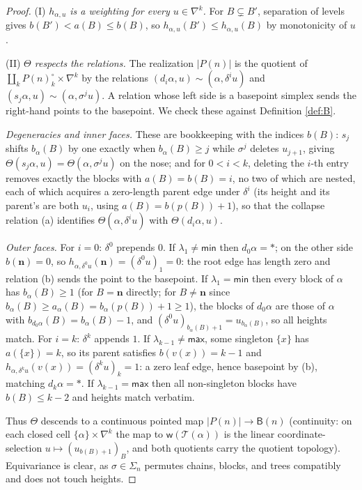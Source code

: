 \documentclass[12pt]{amsart}
\theoremstyle{definition}
\theoremstyle{remark}
\newcommand{\BC}{\mathsf{B}}                     %
\newcommand{\TreeF}{\mathcal{T}}                 %
\newcommand{\wt}{\mathsf{w}}                     %
\newcommand{\Thet}{\Theta}                       %
\newcommand{\basept}{\ast}
\begin{document}
\begin{proof}
(I) \emph{$h_{\alpha,u}$ is a weighting for every $u\in\nabla^k$.} For $B\subsetneq B'$, separation of levels gives $b(B')<a(B)\leq b(B)$, so $h_{\alpha,u}(B')\leq h_{\alpha,u}(B)$ by monotonicity of $u$.

(II) \emph{$\Thet$ respects the relations.} The realization $|P(n)|$ is the quotient of $\coprod_k P(n)^{\circ}_k\times \nabla^k$ by the relations $(d_i\alpha, u)\sim (\alpha, \delta^i u)$ and $(s_j \alpha, u)\sim (\alpha, \sigma^j u)$. A relation whose left side is a basepoint simplex sends the right-hand points to the basepoint. We check these against Definition \ref{def:B}.

\emph{Degeneracies and inner faces.} These are bookkeeping with the indices $b(B)$: $s_j$ shifts $b_\alpha(B)$ by one exactly when $b_\alpha(B)\geq j$ while $\sigma^j$ deletes $u_{j+1}$, giving $\Thet(s_j\alpha,u)=\Thet(\alpha,\sigma^ju)$ on the nose; and for $0<i<k$, deleting the $i$-th entry removes exactly the blocks with $a(B)=b(B)=i$, no two of which are nested, each of which acquires a zero-length parent edge under $\delta^i$ (its height and its parent's are both $u_i$, using $a(B)=b(p(B))+1$), so that the collapse relation (a) identifies $\Thet(\alpha,\delta^iu)$ with $\Thet(d_i\alpha,u)$.

\emph{Outer faces.} For $i=0$: $\delta^0$ prepends $0$. If $\lambda_1 \neq \mathsf{min}$ then $d_0\alpha=\basept$; on the other side $b(\mathbf{n}) = 0$, so $h_{\alpha, \delta^0 u}(\mathbf{n}) = (\delta^0 u)_1 = 0$: the root edge has length zero and relation (b) sends the point to the basepoint. If $\lambda_1 = \mathsf{min}$ then every block of $\alpha$ has $b_\alpha(B)\geq 1$ (for $B = \mathbf{n}$ directly; for $B\neq \mathbf{n}$ since $b_\alpha(B)\geq a_\alpha(B) = b_\alpha(p(B))+1\geq 1$), the blocks of $d_0\alpha$ are those of $\alpha$ with $b_{d_0\alpha}(B) = b_\alpha(B)-1$, and $(\delta^0u)_{b_\alpha(B)+1} = u_{b_\alpha(B)}$, so all heights match. For $i=k$: $\delta^k$ appends $1$. If $\lambda_{k-1}\neq \mathsf{max}$, some singleton $\{x\}$ has $a(\{x\}) = k$, so its parent satisfies $b(v(x)) = k-1$ and $h_{\alpha,\delta^ku}(v(x)) = (\delta^ku)_k = 1$: a zero leaf edge, hence basepoint by (b), matching $d_k\alpha = \basept$. If $\lambda_{k-1}=\mathsf{max}$ then all non-singleton blocks have $b(B)\leq k-2$ and heights match verbatim.

Thus $\Thet$ descends to a continuous pointed map $|P(n)|\to \BC(n)$ (continuity: on each closed cell $\{\alpha\}\times\nabla^k$ the map to $\wt(\TreeF(\alpha))$ is the linear coordinate-selection $u\mapsto (u_{b(B)+1})_B$, and both quotients carry the quotient topology). Equivariance is clear, as $\sigma\in\Sigma_n$ permutes chains, blocks, and trees compatibly and does not touch heights.


\end{proof}
\end{document}
